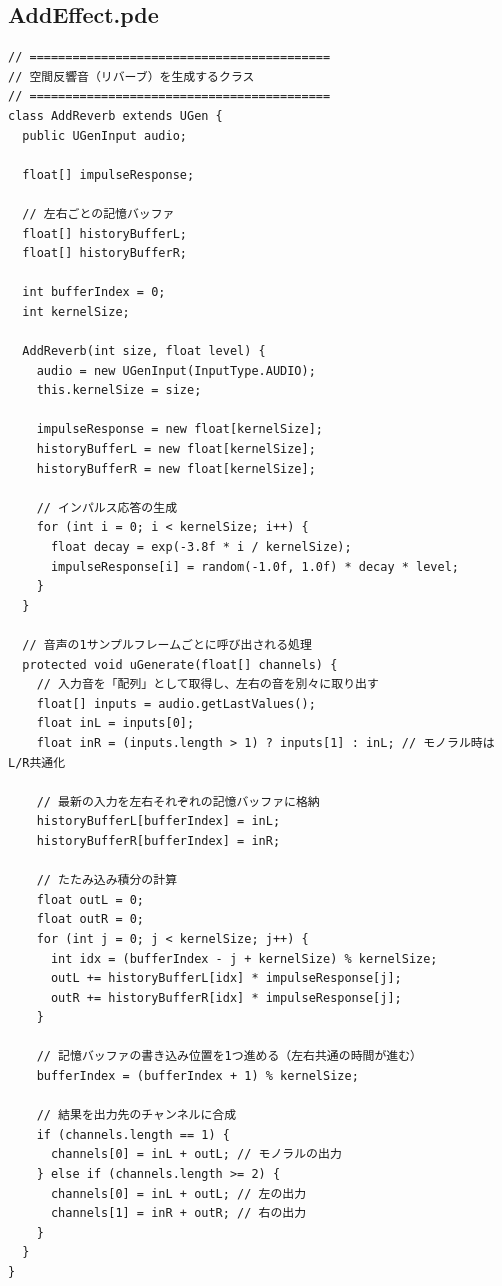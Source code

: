 \subsection{AddEffect.pde}
\begin{lstlisting}[caption={AddEffect.pde}, label={lst:proc_addeffect}]
// ==========================================
// 空間反響音（リバーブ）を生成するクラス
// ==========================================
class AddReverb extends UGen {
  public UGenInput audio;
  
  float[] impulseResponse;
  
  // 左右ごとの記憶バッファ
  float[] historyBufferL;
  float[] historyBufferR;
  
  int bufferIndex = 0;
  int kernelSize;

  AddReverb(int size, float level) {
    audio = new UGenInput(InputType.AUDIO);
    this.kernelSize = size;
    
    impulseResponse = new float[kernelSize];
    historyBufferL = new float[kernelSize];
    historyBufferR = new float[kernelSize];
    
    // インパルス応答の生成
    for (int i = 0; i < kernelSize; i++) {
      float decay = exp(-3.8f * i / kernelSize);
      impulseResponse[i] = random(-1.0f, 1.0f) * decay * level;
    }
  }

  // 音声の1サンプルフレームごとに呼び出される処理
  protected void uGenerate(float[] channels) {
    // 入力音を「配列」として取得し、左右の音を別々に取り出す
    float[] inputs = audio.getLastValues();
    float inL = inputs[0]; 
    float inR = (inputs.length > 1) ? inputs[1] : inL; // モノラル時はL/R共通化
    
    // 最新の入力を左右それぞれの記憶バッファに格納
    historyBufferL[bufferIndex] = inL;
    historyBufferR[bufferIndex] = inR;
    
    // たたみ込み積分の計算
    float outL = 0;
    float outR = 0;
    for (int j = 0; j < kernelSize; j++) {
      int idx = (bufferIndex - j + kernelSize) % kernelSize;
      outL += historyBufferL[idx] * impulseResponse[j];
      outR += historyBufferR[idx] * impulseResponse[j];
    }
    
    // 記憶バッファの書き込み位置を1つ進める（左右共通の時間が進む）
    bufferIndex = (bufferIndex + 1) % kernelSize;
    
    // 結果を出力先のチャンネルに合成
    if (channels.length == 1) {
      channels[0] = inL + outL; // モノラルの出力
    } else if (channels.length >= 2) {
      channels[0] = inL + outL; // 左の出力
      channels[1] = inR + outR; // 右の出力
    }
  }
}
\end{lstlisting}

